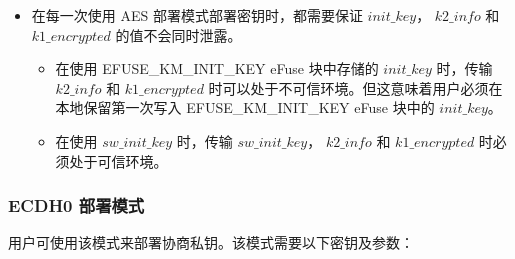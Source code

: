 \documentclass[main\_\_CN.tex]{subfiles}
\begin{document}
\begin{itemize}
    \item 在每一次使用 AES 部署模式部署密钥时，都需要保证 \hyperref[para:initkey]{\begin{math}init\_key\end{math}}， \hyperref[para:k2info]{\begin{math}k2\_info\end{math}} 和 \hyperref[para:k1enc]{\begin{math}k1\_encrypted\end{math}} 的值不会同时泄露。
    \begin{itemize}
        \item 在使用 EFUSE\_KM\_INIT\_KEY eFuse 块中存储的 \hyperref[para:initkey]{\begin{math}init\_key\end{math}} 时，传输 \hyperref[para:k2info]{\begin{math}k2\_info\end{math}} 和 \hyperref[para:k1enc]{\begin{math}k1\_encrypted\end{math}} 时可以处于不可信环境。但这意味着用户必须在本地保留第一次写入 EFUSE\_KM\_INIT\_KEY eFuse 块中的 \hyperref[para:initkey]{\begin{math}init\_key\end{math}}。
        \item 在使用 \begin{math}sw\_init\_key\end{math} 时，传输 \begin{math}sw\_init\_key\end{math}， \hyperref[para:k2info]{\begin{math}k2\_info\end{math}} 和 \hyperref[para:k1enc]{\begin{math}k1\_encrypted\end{math}} 时必须处于可信环境。
    \end{itemize}
\end{itemize}

\subsubsection{ECDH0 部署模式}

用户可使用该模式来部署协商私钥。该模式需要以下密钥及参数：
\end{document}
